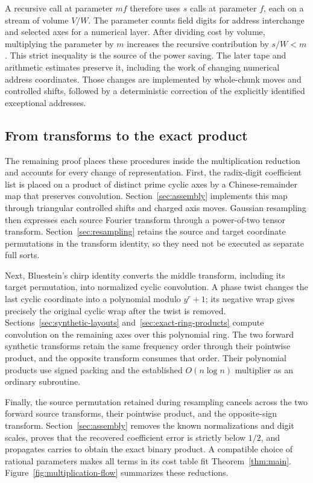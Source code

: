 \documentclass[11pt]{article}
\theoremstyle{definition}
\begin{document}
A recursive call at parameter $mf$ therefore uses $s$ calls at parameter
$f$, each on a stream of volume $V/W$. The parameter counts field
digits for address interchange and selected axes for a numerical layer.
After dividing cost by volume, multiplying the parameter by $m$
increases the recursive contribution by $s/W<m$. This strict inequality
is the source of the power saving. The later tape and arithmetic
estimates preserve it, including the work of changing numerical address
coordinates. Those changes are implemented by whole-chunk moves and
controlled shifts, followed by a deterministic correction of the
explicitly identified exceptional addresses.

\subsection{From transforms to the exact product}

The remaining proof places these procedures inside the multiplication
reduction and accounts for every change of representation.
First, the radix-digit coefficient list is placed on a product of
distinct prime cyclic axes by a Chinese-remainder map that preserves
convolution. Section~\ref{sec:assembly} implements this map through
triangular controlled shifts and charged axis moves. Gaussian
resampling then expresses each source Fourier transform through a
power-of-two tensor transform. Section~\ref{sec:resampling} retains the
source and target coordinate permutations in the transform identity,
so they need not be executed as separate full sorts.

Next, Bluestein's chirp identity converts the middle transform,
including its target permutation, into normalized cyclic convolution.
A phase twist changes the last cyclic coordinate into a polynomial
modulo $y^r+1$; its negative wrap gives precisely the original cyclic
wrap after the twist is removed. Sections~\ref{sec:synthetic-layouts}
and~\ref{sec:exact-ring-products} compute convolution on the remaining
axes over this polynomial ring. The two forward synthetic transforms
retain the same frequency order through their pointwise product, and
the opposite transform consumes that order. Their polynomial products
use signed packing and the established $O(n\log n)$ multiplier as an
ordinary subroutine.

Finally, the source permutation retained during resampling cancels
across the two forward source transforms, their pointwise product,
and the opposite-sign transform. Section~\ref{sec:assembly} removes
the known normalizations and digit scales, proves that the recovered
coefficient error is strictly below $1/2$, and propagates carries to
obtain the exact binary product. A compatible choice of rational
parameters makes all terms in its cost table fit Theorem~\ref{thm:main}.
Figure~\ref{fig:multiplication-flow} summarizes these reductions.
\end{document}
